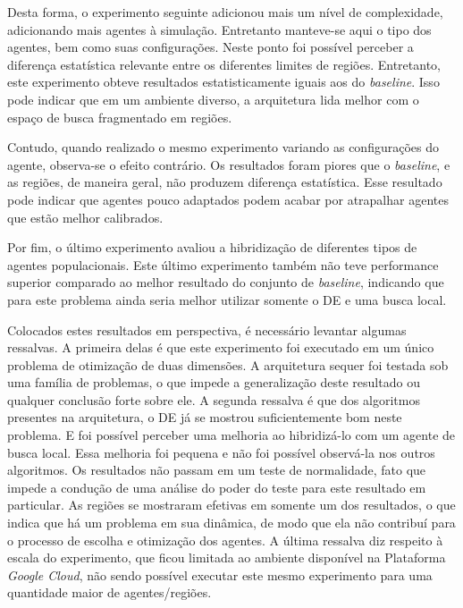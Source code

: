 Desta forma, o experimento seguinte adicionou mais um nível de complexidade, adicionando mais agentes à simulação. Entretanto manteve-se aqui o tipo dos agentes, bem como suas configurações. Neste ponto foi possível perceber a diferença estatística relevante entre os diferentes limites de regiões. Entretanto, este experimento obteve resultados estatisticamente iguais aos do \textit{baseline}. Isso pode indicar que em um ambiente diverso, a arquitetura lida melhor com o espaço de busca fragmentado em regiões. 

Contudo, quando realizado o mesmo experimento variando as configurações do agente, observa-se o efeito contrário. Os resultados foram piores que o \textit{baseline}, e as regiões, de maneira geral, não produzem diferença estatística. Esse resultado pode indicar que agentes pouco adaptados podem acabar por atrapalhar agentes que estão melhor calibrados. 

Por fim, o último experimento avaliou a hibridização de diferentes tipos de agentes populacionais. Este último experimento também não teve performance superior comparado ao melhor resultado do conjunto de \textit{baseline}, indicando que para este problema ainda seria melhor utilizar somente o DE e uma busca local.

Colocados estes resultados em perspectiva, é necessário levantar algumas ressalvas. A primeira delas é que este experimento foi executado em um único problema de otimização de duas dimensões. A arquitetura sequer foi testada sob uma família de problemas, o que impede a generalização deste resultado ou qualquer conclusão forte sobre ele. A segunda ressalva é que dos algoritmos presentes na arquitetura, o DE já se mostrou suficientemente bom neste problema. E foi possível perceber uma melhoria ao hibridizá-lo com um agente de busca local. Essa melhoria foi pequena e não foi possível observá-la nos outros algoritmos. Os resultados não passam em um teste de normalidade, fato que impede a condução de uma análise do poder do teste para este resultado em particular. As regiões se mostraram efetivas em somente um dos resultados, o que indica que há um problema em sua dinâmica, de modo que ela não contribuí para o processo de escolha e otimização dos agentes. A última ressalva diz respeito à escala do experimento, que ficou limitada ao ambiente disponível na Plataforma \textit{Google Cloud}, não sendo possível executar este mesmo experimento para uma quantidade maior de agentes/regiões.

